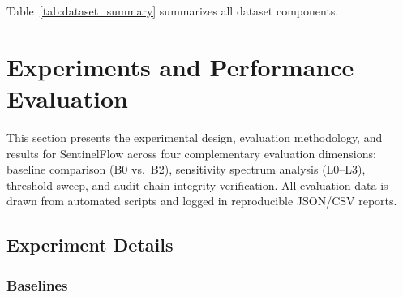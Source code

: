 \documentclass[journal,12pt,onecolumn,draftclsnofoot]{IEEEtran}
\begin{document}
Table~\ref{tab:dataset_summary} summarizes all dataset components.

\begin{table}[!ht]
    \centering
    \caption{Dataset Summary}
    \label{tab:dataset_summary}
\end{table}




\section{Experiments and Performance Evaluation}
\label{Sect:Experimental_Procedure_Performance_Evaluation}
%
This section presents the experimental design, evaluation methodology, and results for SentinelFlow across four complementary evaluation dimensions: baseline comparison (B0 vs.\ B2), sensitivity spectrum analysis (L0--L3), threshold sweep, and audit chain integrity verification. All evaluation data is drawn from automated scripts and logged in reproducible JSON/CSV reports.

\subsection{Experiment Details}
\label{Sect:Experiment_Details}

\subsubsection{Baselines}
\end{document}
